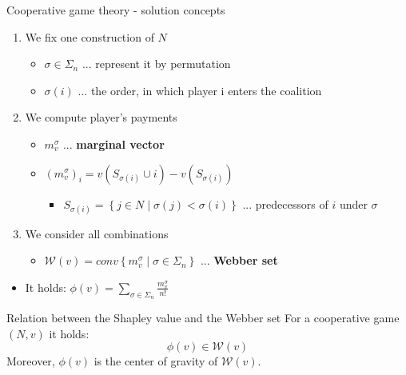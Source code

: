 \documentclass{beamer}
\begin{document}
\begin{frame}{Cooperative game theory - solution concepts}
    \begin{enumerate}
		\item We fix one construction of $N$
		\begin{itemize}
			\item $\sigma \in \Sigma_n$ ... represent it by permutation
			\item $\sigma(i)$ ... the order, in which player i enters the coalition
		\end{itemize}
		\item We compute player's payments
		\begin{itemize}
			\item $m^\sigma_v$ ... \textbf{marginal vector}
			\item $\left(m^\sigma_v\right)_i=v\left(S_{\sigma(i)}\cup i\right)-v\left(S_{\sigma(i)}\right)$
			\begin{itemize}
				\item $S_{\sigma(i)}= \left\{j \in N \mid \sigma(j) < \sigma(i)\right\}$ ... predecessors of $i$ under $\sigma$
			\end{itemize}
		\end{itemize}
		\item We consider all combinations
		\begin{itemize}
			\item $\mathcal{W}(v)=conv\left\{m^{\sigma}_{v}\mid \sigma \in \Sigma_n\right\}$ ... \textbf{Webber set}
		\end{itemize}
	\end{enumerate}
	\begin{itemize}
		\item It holds: $\phi(v)=\sum_{\sigma \in \Sigma_n} \frac{m^\sigma_v}{n!}$
	\end{itemize}
	\begin{block}{Relation between the Shapley value and the Webber set}
		For a cooperative game $(N,v)$ it holds:
		\[\phi(v) \in \mathcal{W}(v)\]
		Moreover, $\phi(v)$ is the center of gravity of $\mathcal{W}(v)$.
	\end{block}
\end{frame}


\end{document}
